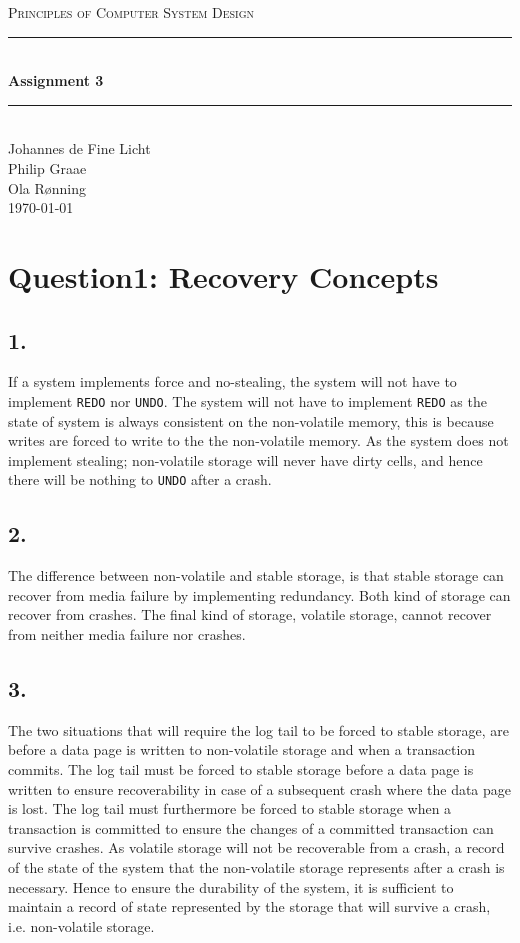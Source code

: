 \documentclass[12pt]{article}
\newcommand{\HRule}{\rule{\linewidth}{0.5mm}}
\begin{document}
\begin{center}
\textsc{\LARGE Principles of Computer System Design}\\[0.3cm] %
\HRule \\[0.4cm]
{ \huge \bfseries Assignment 3} %
\HRule \\[0.4cm]
\large
Johannes de Fine Licht %
\\Philip Graae
\\Ola Rønning
\\\today
\end{center}
\section*{Question1: Recovery Concepts}
\subsection*{1.}
If a system implements force and no-stealing, the system will not have to implement \texttt{REDO} nor \texttt{UNDO}. The system will not have to implement \texttt{REDO} as the state of system is always consistent on the non-volatile memory, this is because writes are forced to write to the the non-volatile memory. As the system does not implement stealing; non-volatile storage will never have dirty cells, and hence there will be nothing to \texttt{UNDO} after a crash.
\subsection*{2.}
The difference between non-volatile and stable storage, is that stable storage can recover from media failure by implementing redundancy. Both kind of storage can recover from crashes. The final kind of storage, volatile storage, cannot recover from neither media failure nor crashes.
\subsection*{3.}
The two situations that will require the log tail to be forced to stable storage, are before a data page is written to non-volatile storage and when a transaction commits. The log tail must be forced to stable storage before a data page is written to ensure recoverability in case of a subsequent crash where the data page is lost. The log tail must furthermore be forced to stable storage when a transaction is committed to ensure the changes of a committed transaction can survive crashes. As volatile storage will not be recoverable from a crash, a record of the state of the system that the non-volatile storage represents after a crash is necessary. Hence to ensure the durability of the system, it is sufficient to maintain a record of state represented by the storage that will survive a crash, i.e. non-volatile storage.
\end{document}

